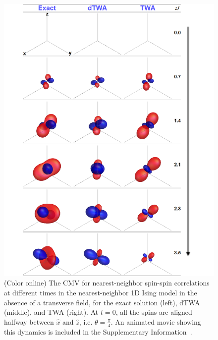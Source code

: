 \documentclass[pra,reprint,superscriptaddress]{revtex4-1}
\begin{document}
\begin{figure}[t]\centering
 \includegraphics[width = 0.9\columnwidth]{Isingpi4modified2.pdf}
 \caption{(Color online) The CMV for nearest-neighbor spin-spin correlations at different times in the nearest-neighbor 1D Ising model in the absence of a transverse field, for the exact solution (left), dTWA (middle), and TWA (right). At $t=0$, all the spins are aligned halfway between $\hat x$ and $\hat z$, i.e. $\theta = \frac{\pi}{4}$. An animated movie showing this dynamics is included in the Supplementary Information~\cite{supplement}.}
 \label{fig: Isingpi4}
\end{figure}
\end{document}
